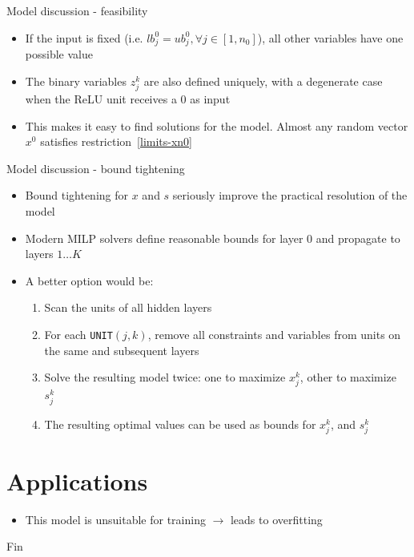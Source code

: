 \documentclass{beamer}
\newcommand{\UNIT}{\texttt{UNIT}$(j,k)$}
\begin{document}
\begin{frame}{Model discussion - feasibility}
  \begin{itemize}
  \item If the input is fixed (i.e. $lb_j^0 = ub_j^0, \forall j \in [1, n_0]$), all other variables have one possible value
  \item The binary variables $z_j^k$ are also defined uniquely, with a degenerate case when the ReLU unit receives a $0$ as input
  \item This makes it easy to find solutions for the model. Almost any random vector $x^0$ satisfies restriction~\ref{limits-xn0}
  \end{itemize}
\end{frame}

\begin{frame}{Model discussion - bound tightening}
  \begin{itemize}
  \item Bound tightening for $x$ and $s$ seriously improve the practical resolution of the model
  \item Modern MILP solvers define reasonable bounds for layer $0$ and propagate to layers $1 \dots K$
  \item A better option would be:
    \begin{enumerate}
    \item Scan the units of all hidden layers
    \item For each \UNIT, remove all constraints and variables from units on the same and subsequent layers
    \item Solve the resulting model twice: one to maximize $x_j^k$, other to maximize $s_j^k$
    \item The resulting optimal values can be used as bounds for $x_j^k$, and $s_j^k$
    \end{enumerate}
  \end{itemize}
\end{frame}

\section{Applications}
\begin{frame}
  \begin{itemize}
  \item This model is unsuitable for training $\rightarrow$ leads to overfitting
  \end{itemize}
\end{frame}

\begin{frame}
  \Huge{\centerline{Fin}}
\end{frame}
\end{document}
